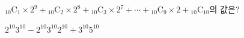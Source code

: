 ${}_{10}\mathrm{C}_1\times2^9+{}_{10}\mathrm{C}_2\times2^8+{}_{10}\mathrm{C}_3\times2^7+\cdots+{}_{10}\mathrm{C}_9\times2+{}_{10}\mathrm{C}_{10}$의 값은?
\begin{choices32}{$2^{10}$}{$3^{10}-2^{10}$}{$3^{10}$}{$2^{10}+3^{10}$}{$5^{10}$}\end{choices32}
